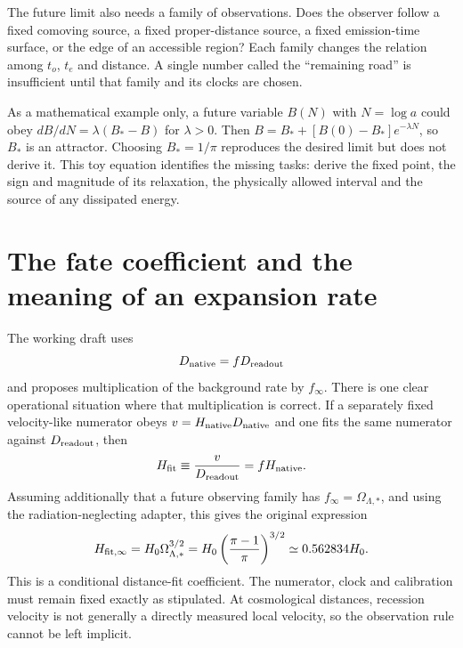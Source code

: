 The future limit also needs a family of observations. Does the observer follow a fixed comoving source, a fixed proper-distance source, a fixed emission-time surface, or the edge of an accessible region? Each family changes the relation among $t_o$, $t_e$ and distance. A single number called the ``remaining road'' is insufficient until that family and its clocks are chosen.

As a mathematical example only, a future variable $B(N)$ with $N=\log a$ could obey $dB/dN=\lambda(B_*-B)$ for $\lambda>0$. Then $B=B_*+[B(0)-B_*]e^{-\lambda N}$, so $B_*$ is an attractor. Choosing $B_*=1/\pi$ reproduces the desired limit but does not derive it. This toy equation identifies the missing tasks: derive the fixed point, the sign and magnitude of its relaxation, the physically allowed interval and the source of any dissipated energy.

\section{The fate coefficient and the meaning of an expansion rate}
The working draft uses
\begin{equation}
 D_{\rm native}=fD_{\rm readout}
 \label{c12:distancemap}
\end{equation}
and proposes multiplication of the background rate by $f_\infty$. There is one clear operational situation where that multiplication is correct. If a separately fixed velocity-like numerator obeys $v=H_{\rm native}D_{\rm native}$ and one fits the same numerator against $D_{\rm readout}$, then
\begin{equation}
 H_{\rm fit}\equiv\frac{v}{D_{\rm readout}}
              =fH_{\rm native}.
 \label{c12:fitrate}
\end{equation}
Assuming additionally that a future observing family has $f_\infty=\Omega_{\Lambda,*}$, and using the radiation-neglecting adapter, this gives the original expression
\begin{equation}
 H_{{\rm fit},\infty}=H_0\Omega_{\Lambda,*}^{3/2}
 =H_0\left(\frac{\pi-1}{\pi}\right)^{3/2}
 \simeq0.562834H_0.
 \label{c12:conditionalfate}
\end{equation}
This is a conditional distance-fit coefficient. The numerator, clock and calibration must remain fixed exactly as stipulated. At cosmological distances, recession velocity is not generally a directly measured local velocity, so the observation rule cannot be left implicit.

